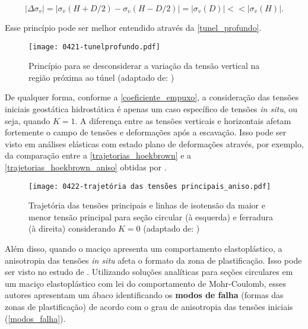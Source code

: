 \begin{equation}
	\left|\Delta\sigma_v\right| = \left| \sigma_v(H+D/2)-\sigma_v(H-D/2)\right| = \left| \sigma_v(D) \right| <<  \left| \sigma_v(H)\right|.
\end{equation}

Esse princípio pode ser melhor entendido através da \autoref{tunel_profundo}.

\begin{figure}[H]
	\begin{center}
		\texttt{[image: 0421-tunelprofundo.pdf]}
	\end{center}
	\caption{\label{tunel_profundo}Princípio para se desconsiderar a variação da tensão vertical na região próxima ao túnel  (adaptado de: )}
\end{figure}

De qualquer forma, conforme a \autoref{coeficiente_empuxo}, a consideração das tensões iniciais geostática hidrostática é apenas um caso específico de tensões \textit{in situ}, ou seja, quando $K=1$. A diferença entre as tensões verticais e horizontais afetam fortemente o campo de tensões e deformações após a escavação. Isso pode ser visto em análises elásticas com estado plano de deformações através, por exemplo, da comparação entre a \autoref{trajetorias_hoekbrown} e a \autoref{trajetorias_hoekbrown_aniso} obtidas por .

\begin{figure}[H]
	\begin{center}
		\texttt{[image: 0422-trajetória das tensões principais\_aniso.pdf]}
	\end{center}
	\caption{\label{trajetorias_hoekbrown_aniso}Trajetória das tensões principais e linhas de isotensão da maior e menor tensão principal para seção circular (à esquerda) e ferradura (à direita) considerando $K=0$  (adaptado de: )}
\end{figure}

Além disso, quando o maciço apresenta um comportamento elastoplástico, a anisotropia das tensões \textit{in situ} afeta o formato da zona de plastificação. Isso pode ser visto no estudo de . Utilizando soluções analíticas para seções circulares em um maciço elastoplástico com lei do comportamento de Mohr-Coulomb, esses autores apresentam um ábaco identificando os \textbf{modos de falha} (formas das zonas de plastificação) de acordo com o grau de anisotropia das tensões iniciais (\autoref{modos_falha}).

